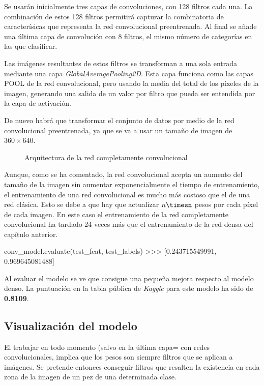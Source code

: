 Se usarán inicialmente tres capas de convoluciones, con 128 filtros cada una. La combinación de estos 128 filtros permitirá capturar la combinatoria de caracterísicas que representa la red convolucional preentrenada. Al final se añade una última capa de convolución con 8 filtros, el mismo número de categorías en las que clasificar.

Las imágenes resultantes de estos filtros se transforman a una sola entrada mediante una capa \textit{GlobalAveragePooling2D}. Esta capa funciona como las capas POOL de la red convolucional, pero usando la media del total de los píxeles de la imagen, generando una salida de un valor por filtro que pueda ser entendida por la capa de activación.

De nuevo habrá que transformar el conjunto de datos por medio de la red convolucional preentrenada, ya que se va a usar un tamaño de imagen de $360\times640$.

\begin{figure}
    \caption{Arquitectura de la red completamente convolucional}
\label{fcn_arch}
\end{figure}

Aunque, como se ha comentado, la red convolucional acepta un aumento del tamaño de la imagen sin aumentar exponencialmente el tiempo de entrenamiento, el entrenamiento de una red convolucional es mucho más costoso que el de una red clásica. Esto se debe a que hay que actualizar $n\timesn$ pesos por cada píxel de cada imagen. En este caso el entrenamiento de la red completamente convolucional ha tardado 24 veces más que el entrenamiento de la red densa del capítulo anterior.

\begin{python}
conv_model.evaluate(test_feat, test_labels)
>>> [0.243715549991, 0.969645081488]
\end{python}

Al evaluar el modelo se ve que consigue una pequeña mejora respecto al modelo
denso. La puntuación en la tabla pública de \textit{Kaggle} para este modelo ha
sido de \textbf{0.8109}.


\subsection{Visualización del modelo}

El trabajar en todo momento (salvo en la última capa= con redes convolucionales, implica que los pesos son siempre filtros que se aplican a imágenes. Se pretende entonces conseguir filtros que resalten la existencia en cada zona de la imagen de un pez de una determinada clase.

